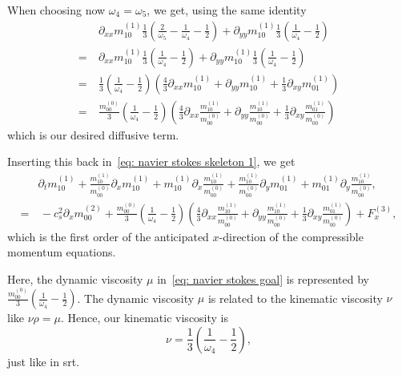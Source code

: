 When choosing now $\omega_4=\omega_5$, we get, using the same identity
\begin{align}
  \nonumber
  &\partial_{xx} m_{10}^{(1)} \frac{1}{3} \left(
    \frac{2}{\omega_5}
    - \frac{1}{\omega_4}
    - \frac{1}{2}
  \right)
  + \partial_{yy} m_{10}^{(1)} \frac{1}{3}\left(
    \frac{1}{\omega_4}
    - \frac{1}{2}
  \right)
  \\=\
  \nonumber
  &\partial_{xx} m_{10}^{(1)} \frac{1}{3} \left(
    \frac{1}{\omega_4}
    - \frac{1}{2}
  \right)
  + \partial_{yy} m_{10}^{(1)} \frac{1}{3}\left(
    \frac{1}{\omega_4}
    - \frac{1}{2}
  \right)
  \\=\ &
  \nonumber
  \frac{1}{3}\left(
    \frac{1}{\omega_4}
    - \frac{1}{2}
  \right) \left(\frac{4}{3}\partial_{xx} m_{10}^{(1)} + \partial_{yy} m_{10}^{(1)} + \frac{1}{3}\partial_{xy} m_{01}^{(1)}\right)
  \\=\ &
  \label{eq: diffusive final}
  \frac{m_{00}^{(0)}}{3}\left(
    \frac{1}{\omega_4}
    - \frac{1}{2}
  \right) \left(\frac{4}{3}\partial_{xx} \frac{m_{10}^{(1)}}{m_{00}^{(0)}}
  + \partial_{yy} \frac{m_{10}^{(1)}}{m_{00}^{(0)}} + \frac{1}{3}\partial_{xy} \frac{m_{01}^{(1)}}{m_{00}^{(0)}}\right)
\end{align}
which is our desired diffusive term.

Inserting this back in~\eqref{eq: navier stokes skeleton 1}, we get
\begin{align}
  \nonumber
& \partial_t m_{10}^{(1)}
+\frac{ m_{10}^{{(1)}} }{m_{00}^{(0)}} \partial_x  m_{10}^{{(1)}}
+  m_{10}^{{(1)}} \partial_x \frac{ m_{10}^{{(1)}} }{m_{00}^{(0)}}
+ \frac{ m_{10}^{(1)}}{m_{00}^{(0)}}\partial_y m_{01}^{(1)}
+ m_{01}^{(1)}\partial_y \frac{ m_{10}^{(1)}}{m_{00}^{(0)}},
\\=&\,
- c_s^2 \partial_x  m_{00}^{(2)}
+ \frac{m_{00}^{(0)}}{3}\left(
    \frac{1}{\omega_4}
    - \frac{1}{2}
  \right) \left(\frac{4}{3}\partial_{xx} \frac{m_{10}^{(1)}}{m_{00}^{(0)}}
  + \partial_{yy} \frac{m_{10}^{(1)}}{m_{00}^{(0)}} + \frac{1}{3}\partial_{xy} \frac{m_{01}^{(1)}}{m_{00}^{(0)}}\right)
+ F_x^{(3)},
\label{eq: navier stokes derived}
\end{align}
which is the first order of the anticipated $x$-direction of the compressible momentum equations.

Here, the dynamic viscosity $\mu$ in~\eqref{eq: navier stokes goal} is represented by $\frac{m_{00}^{(0)}}{3}\left(\frac{1}{\omega_4} - \frac{1}{2}\right)$.
The dynamic viscosity $\mu$  is related to the kinematic viscosity $\nu$ like $\nu\rho=\mu$.
Hence, our kinematic viscosity is
\begin{equation}
  \nu = \frac{1}{3}\left(
      \frac{1}{\omega_4}
      - \frac{1}{2}
    \right),
\end{equation}
just like in \gls{srt}.

